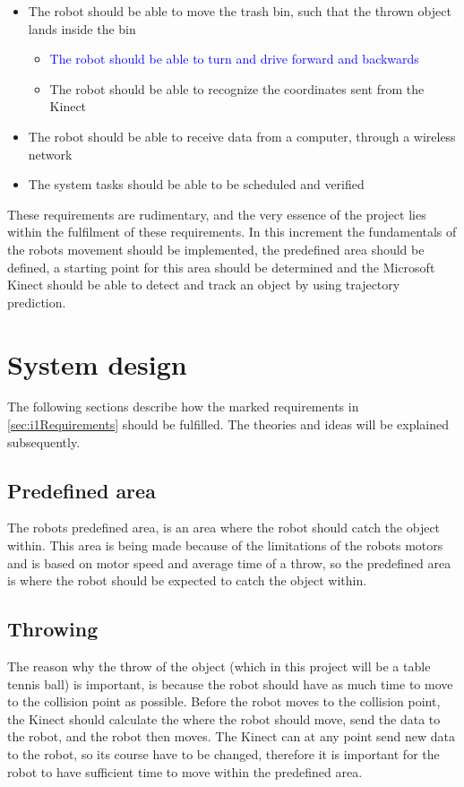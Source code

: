 \begin{itemize}
\begin{itemize}
	\end{itemize}
	\item The robot should be able to move the trash bin, such that the thrown object lands inside the bin
	\begin{itemize}
		\item \textcolor{blue}{The robot should be able to turn and drive forward and backwards}
		\item {The robot should be able to recognize the coordinates sent from the Kinect}
	\end{itemize}
	\item {The robot should be able to receive data from a computer, through a wireless network}
	\item {The system tasks should be able to be scheduled and verified}
\end{itemize}

These requirements are rudimentary, and the very essence of the project lies within the fulfilment of these requirements. In this increment the fundamentals of the robots movement should be implemented, the predefined area should be defined, a starting point for this area should be determined and the Microsoft Kinect should be able to detect and track an object by using trajectory prediction.

\section{System design}
\label{sec:i1System Design}
The following sections describe how the marked requirements in \ref{sec:i1Requirements} should be fulfilled. The theories and ideas will be explained subsequently.

\subsection{Predefined area}
\label{sec:i1Predefined area}
The robots predefined area, is an area where the robot should catch the object within. This area is being made because of the limitations of the robots motors and is based on motor speed and average time of a throw, so the predefined area is where the robot should be expected to catch the object within.

\subsection{Throwing}
\label{sec:i1Throwing}
The reason why the throw of the object (which in this project will be a table tennis ball) is important, is because the robot should have as much time to move to the collision point as possible. Before the robot moves to the collision point, the Kinect should calculate the where the robot should move, send the data to the robot, and the robot then moves. The Kinect can at any point send new data to the robot, so its course have to be changed, therefore it is important for the robot to have sufficient time to move within the predefined area.    

